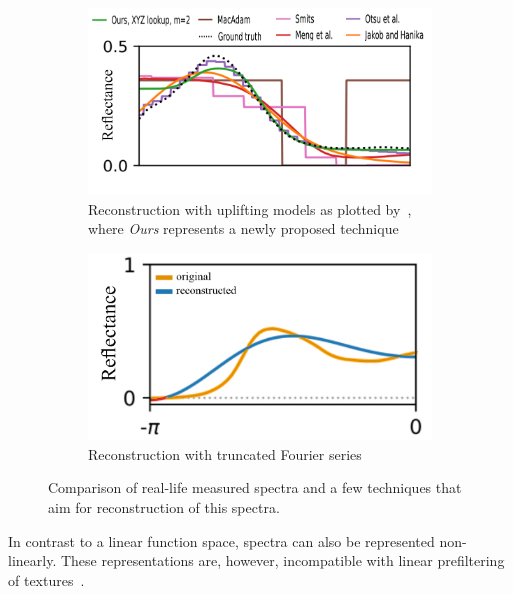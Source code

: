 \begin{figure}[t]
	\centering
	\begin{subfigure}[t]{0.45\textwidth}
		\includegraphics[width=\linewidth]{img/spectra_rec_method_comparison.png}
		\caption{Reconstruction with uplifting models as plotted by~\citet{trigonometricMomentsPaper}, where \emph{Ours} represents a newly proposed technique}
		\label{fig:specRecUpliftingMethods}
	\end{subfigure} \hspace{0.1em}
	\begin{subfigure}[t]{0.45\textwidth}
		\includegraphics[width=\linewidth]{img/spectra_rec_truncated_fourier.png}
		\caption{Reconstruction with truncated Fourier series~\cite{trigonometricMomentsPresentation}}
		\label{fig:specRecTruncatedFourier}
	\end{subfigure}
	\caption{Comparison of real-life measured spectra and a few techniques that aim for reconstruction of this spectra.}
	\label{fig:spectraReconstruction}
\end{figure}

In contrast to a linear function space, spectra can also be represented non-linearly. These representations are, however, incompatible with linear prefiltering of textures~\cite{trigonometricMomentsPaper}.

